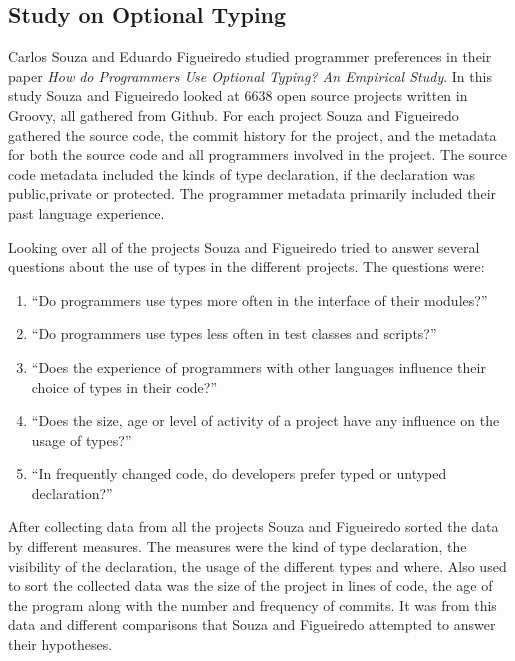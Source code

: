 \documentclass{sig-alternate}
\begin{document}
\subsection{Study on Optional Typing}
Carlos Souza and Eduardo Figueiredo studied programmer preferences in their paper \emph{How do Programmers Use Optional Typing? An Empirical Study}. In this study Souza and Figueiredo looked at 6638 open source projects written in Groovy, all gathered from Github. For each project Souza and Figueiredo gathered the source code, the commit history for the project, and the metadata for both the source code and all programmers involved in the project.
The source code metadata included the kinds of type declaration, if the declaration was public,private or protected. The programmer metadata primarily included their past language experience.

Looking over all of the projects Souza and Figueiredo tried to answer several questions about the use of types in the different projects. The questions were: 
\begin{enumerate}
\item \label{interface} ``Do programmers use types more often in the interface of their modules?''
\item \label{tests} ``Do programmers use types less often in test classes and scripts?''
\item \label{experience} ``Does the experience of programmers with other languages influence their choice of types in their code?''
\item \label{sizeageactivity} ``Does the size, age or level of activity of a project have any influence on the usage of types?''
\item \label{changed} ``In frequently changed code, do developers prefer typed or untyped declaration?'' 
\end{enumerate}
After collecting data from all the projects Souza and Figueiredo sorted the data by different measures. The measures were the kind of type declaration, the visibility of the declaration, the usage of the different types and where. Also used to sort the collected data was the size of the project in lines of code, the age of the program along with the number and frequency of commits. It was from this data and different comparisons that Souza and Figueiredo attempted to answer their hypotheses.
\end{document}
